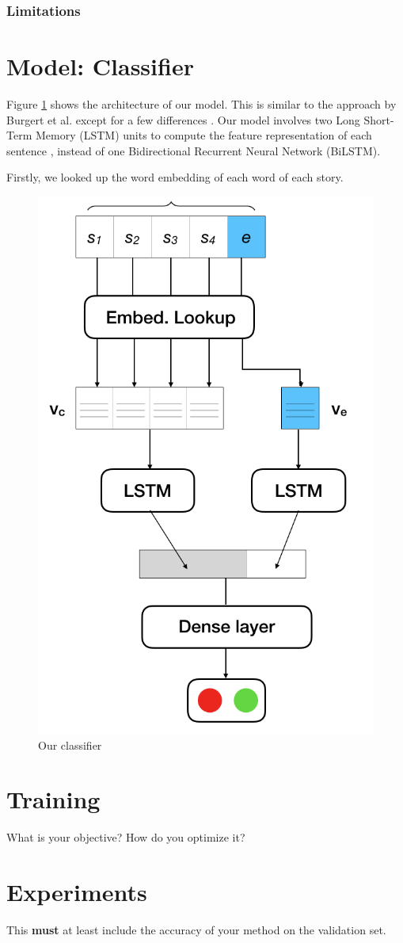 \documentclass{article}
\begin{document}
\subsubsection{Limitations}


\section{Model: Classifier}

Figure \ref{Figure:model} shows the architecture of our model. This is similar to the approach by Burgert et al. except for a few differences \cite{top4}. Our model involves two Long Short-Term Memory (LSTM) units to compute the feature representation of each sentence \citep{lstm}, instead of one Bidirectional Recurrent Neural Network (BiLSTM).

Firstly, we looked up the word embedding of each word of each story. 
\begin{figure}
  \centering
  \includegraphics[width=0.5 \linewidth]{fig/ourmodel.PNG}
  \caption{Our classifier}
  \label{Figure:model}
\end{figure}

\section{Training}
What is your objective? How do you optimize it?

\section{Experiments}
This {\bf must} at least include the accuracy of your method on the validation set.
\end{document}
